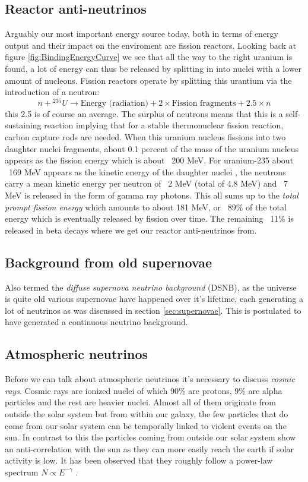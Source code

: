 \documentclass[11pt,a4paper,faculty=we,language=en,doctype=report]{cls/ugent-doc}
\begin{document}
\subsection{Reactor anti-neutrinos}
Arguably our most important energy source today, both in terms of energy output
and their impact on the enviroment are fission reactors.  Looking back at
figure \ref{fig:BindingEnergyCurve} we see that all the way to the right
uranium is found, a lot of energy can thus be released by splitting in into
nuclei with a lower amount of nucleons.  Fission reactors operate by splitting
this urantium via the introduction of a neutron:
\begin{equation}
	n + {}^{235}U \rightarrow \text{Energy (radiation)} + 2\times\text{Fission fragments} + 2.5\times n
\end{equation}
this 2.5 is of course an average. The surplus of neutrons means that this is a
self-sustaining reaction implying that for a stable thermonuclear fission
reaction, carbon capture rods are needed.  When this uranium nucleus fissions
into two daughter nuclei fragments, about 0.1 percent of the mass of the
uranium nucleus appears as the fission energy which is about ~200 MeV. For
uranium-235 about ~169 MeV appears as the kinetic energy of the daughter nuclei
, the neutrons carry a mean kinetic energy per neutron of ~2 MeV (total of 4.8
MeV) and ~7 MeV is released in the form of gamma ray photons.  This all sums up
to the \textit{total prompt fission energy} which amounts to about 181 MeV, or
~89\% of the total energy which is eventually released by fission over time.
The remaining ~11\% is released in beta decays where we get our reactor
anti-neutrinos from.
\subsection{Background from old supernovae}
Also termed the \textit{diffuse supernova neutrino background} (DSNB), as the
universe is quite old various supernovae have happened over it's lifetime, each generating
a lot of neutrinos as was discussed in section \ref{sec:supernovae}. 
This is postulated to have generated a continuous neutrino background.
\subsection{Atmospheric neutrinos}
\label{sec:AtmosphericNeutrinos}
Before we can talk about atmospheric neutrinos it's necessary to discuss \textit{cosmic rays}.
Cosmic rays are ionized nuclei of which 90\% are protons, 9\% are alpha particles and
the rest are heavier nuclei. Almost all of them originate from outside the solar system but
from within our galaxy, the few particles that do come from our solar system can be temporally
linked to violent events on the sun. In contrast to this the particles coming from outside
our solar system show an anti-correlation with the sun as they can more easily reach the earth
if solar activity is low.
It has been observed that they roughly follow a power-law spectrum 
$N \propto E^{-\gamma}$ \cite{gaisser_engel_resconi_2016}.
\end{document}
